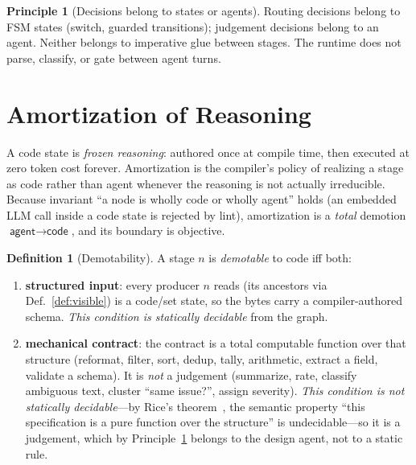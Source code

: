 \documentclass[11pt]{article}
\theoremstyle{plain}
\theoremstyle{definition}
\newtheorem{definition}[theorem]{Definition}
\newtheorem{principle}[theorem]{Principle}
\theoremstyle{remark}
\newcommand{\state}[1]{\textsf{#1}}
\begin{document}
\begin{principle}[Decisions belong to states or agents]\label{prin:decisions}
Routing decisions belong to FSM states (\state{switch}, guarded transitions);
judgement decisions belong to an agent. Neither belongs to imperative glue between
stages. The runtime does not parse, classify, or gate between agent turns.
\end{principle}

\section{Amortization of Reasoning}\label{sec:amortization}

A \state{code} state is \emph{frozen reasoning}: authored once at compile time, then
executed at zero token cost forever. Amortization is the compiler's policy of
realizing a stage as \state{code} rather than \state{agent} whenever the reasoning
is not actually irreducible. Because invariant ``a node is wholly \state{code} or
wholly \state{agent}'' holds (an embedded LLM call inside a code state is rejected
by lint), amortization is a \emph{total} demotion $\state{agent} \to \state{code}$,
and its boundary is objective.

\begin{definition}[Demotability]\label{def:demote}
A stage $n$ is \emph{demotable} to \state{code} iff both:
\begin{enumerate}[label=(\alph*),nosep]
  \item \textbf{structured input}: every producer $n$ reads (its ancestors via
        Def.~\ref{def:visible}) is a \state{code}/\state{set} state, so the bytes
        carry a compiler-authored schema. \emph{This condition is statically
        decidable} from the graph.
  \item \textbf{mechanical contract}: the contract is a total computable function
        over that structure (reformat, filter, sort, dedup, tally, arithmetic,
        extract a field, validate a schema). It is \emph{not} a judgement
        (summarize, rate, classify ambiguous text, cluster ``same issue?'',
        assign severity). \emph{This condition is not statically decidable}---by
        Rice's theorem~\cite{rice}, the semantic property ``this specification is a pure
        function over the structure'' is undecidable---so it is a judgement, which
        by Principle~\ref{prin:decisions} belongs to the design agent, not to a
        static rule.
\end{enumerate}
\end{definition}
\end{document}
